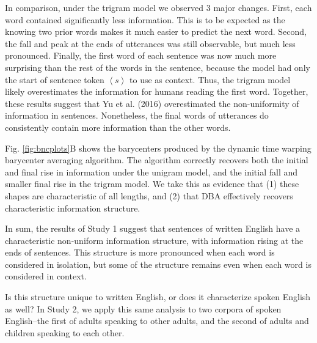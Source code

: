 \documentclass[man,floatsintext]{apa6}
\begin{document}
In comparison, under the trigram model we observed 3 major changes. First, each word contained significantly less information. This is to be expected as the knowing two prior words makes it much easier to predict the next word. Second, the fall and peak at the ends of utterances was still observable, but much less pronounced. Finally, the first word of each sentence was now much more surprising than the rest of the words in the sentence, because the model had only the start of sentence token \(\left<s\right>\) to use as context. Thus, the trigram model likely overestimates the information for humans reading the first word. Together, these results suggest that Yu et al. (2016) overestimated the non-uniformity of information in sentences. Nonetheless, the final words of utterances do consistently contain more information than the other words.

Fig. \ref{fig:bncplots}B shows the barycenters produced by the dynamic time warping barycenter averaging algorithm. The algorithm correctly recovers both the initial and final rise in information under the unigram model, and the initial fall and smaller final rise in the trigram model. We take this as evidence that (1) these shapes are characteristic of all lengths, and (2) that DBA effectively recovers characteristic information structure.

In sum, the results of Study 1 suggest that sentences of written English have a characteristic non-uniform information structure, with information rising at the ends of sentences. This structure is more pronounced when each word is considered in isolation, but some of the structure remains even when each word is considered in context.

Is this structure unique to written English, or does it characterize spoken English as well? In Study 2, we apply this same analysis to two corpora of spoken English--the first of adults speaking to other adults, and the second of adults and children speaking to each other.
\end{document}
